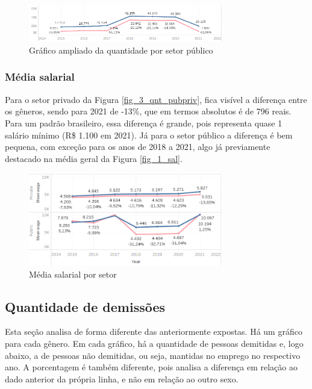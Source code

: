 \begin{figure}[htbp]
	\centerline{
		\includegraphics[width=85mm]{assets/3_1_qnt_pubpriv.PNG}
	}
	\caption{Gráfico ampliado da quantidade por setor público}
	\label{fig_3_1_qnt_pubpriv}
\end{figure}

\subsubsection{Média salarial}

Para o setor privado da Figura \ref{fig_3_qnt_pubpriv}, fica visível a diferença entre os gêneros, sendo para 2021 de -13\%, que em termos absolutos é de 796 reais. Para um padrão brasileiro, essa diferença é grande, pois representa quase 1 salário mínimo (R\$ 1.100 em 2021). Já para o setor público a diferença é bem pequena, com exceção para os anos de 2018 a 2021, algo já previamente destacado na média geral da Figura \ref{fig_1_sal}.

\begin{figure}[htbp]
	\centerline{
		\includegraphics[width=85mm]{assets/3_sal_pubpriv.PNG}
	}
	\caption{Média salarial por setor}
	\label{fig_3_sal_pubpriv}
\end{figure}

\subsection{Quantidade de demissões}

Esta seção analisa de forma diferente das anteriormente expostas. Há um gráfico para cada gênero. Em cada gráfico, há a quantidade de pessoas demitidas e, logo abaixo, a de pessoas não demitidas, ou seja, mantidas no emprego no respectivo ano. A porcentagem é também diferente, pois analisa a diferença em relação ao dado anterior da própria linha, e não em relação ao outro sexo.

